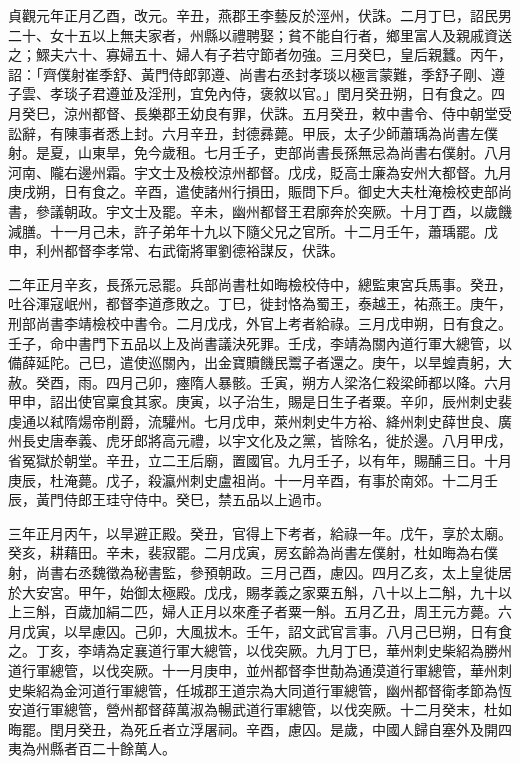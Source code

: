 \begin{pinyinscope}
 貞觀元年正月乙酉，改元。辛丑，燕郡王李藝反於涇州，伏誅。二月丁巳，詔民男二十、女十五以上無夫家者，州縣以禮聘娶；貧不能自行者，鄉里富人及親戚資送之；鰥夫六十、寡婦五十、婦人有子若守節者勿強。三月癸巳，皇后親蠶。丙午，詔：「齊僕射崔季舒、黃門侍郎郭遵、尚書右丞封孝琰以極言蒙難，季舒子剛、遵子雲、孝琰子君遵並及淫刑，宜免內侍，褒敘以官。」閏月癸丑朔，日有食之。四月癸巳，涼州都督、長樂郡王幼良有罪，伏誅。五月癸丑，敕中書令、侍中朝堂受訟辭，有陳事者悉上封。六月辛丑，封德彞薨。甲辰，太子少師蕭瑀為尚書左僕射。是夏，山東旱，免今歲租。七月壬子，吏部尚書長孫無忌為尚書右僕射。八月河南、隴右邊州霜。宇文士及檢校涼州都督。戊戌，貶高士廉為安州大都督。九月庚戌朔，日有食之。辛酉，遣使諸州行損田，賑問下戶。御史大夫杜淹檢校吏部尚書，參議朝政。宇文士及罷。辛未，幽州都督王君廓奔於突厥。十月丁酉，以歲饑減膳。十一月己未，許子弟年十九以下隨父兄之官所。十二月壬午，蕭瑀罷。戊申，利州都督李孝常、右武衛將軍劉德裕謀反，伏誅。



 二年正月辛亥，長孫元忌罷。兵部尚書杜如晦檢校侍中，總監東宮兵馬事。癸丑，吐谷渾寇岷州，都督李道彥敗之。丁巳，徙封恪為蜀王，泰越王，祐燕王。庚午，刑部尚書李靖檢校中書令。二月戊戌，外官上考者給祿。三月戊申朔，日有食之。壬子，命中書門下五品以上及尚書議決死罪。壬戌，李靖為關內道行軍大總管，以備薛延陀。己巳，遣使巡關內，出金寶贖饑民鬻子者還之。庚午，以旱蝗責躬，大赦。癸酉，雨。四月己卯，瘞隋人暴骸。壬寅，朔方人梁洛仁殺梁師都以降。六月甲申，詔出使官稟食其家。庚寅，以子治生，賜是日生子者粟。辛卯，辰州刺史裴虔通以弒隋煬帝削爵，流驩州。七月戊申，萊州刺史牛方裕、絳州刺史薛世良、廣州長史唐奉義、虎牙郎將高元禮，以宇文化及之黨，皆除名，徙於邊。八月甲戌，省冤獄於朝堂。辛丑，立二王后廟，置國官。九月壬子，以有年，賜酺三日。十月庚辰，杜淹薨。戊子，殺瀛州刺史盧祖尚。十一月辛酉，有事於南郊。十二月壬辰，黃門侍郎王珪守侍中。癸巳，禁五品以上過市。



 三年正月丙午，以旱避正殿。癸丑，官得上下考者，給祿一年。戊午，享於太廟。癸亥，耕藉田。辛未，裴寂罷。二月戊寅，房玄齡為尚書左僕射，杜如晦為右僕射，尚書右丞魏徵為秘書監，參預朝政。三月己酉，慮囚。四月乙亥，太上皇徙居於大安宮。甲午，始御太極殿。戊戌，賜孝義之家粟五斛，八十以上二斛，九十以上三斛，百歲加絹二匹，婦人正月以來產子者粟一斛。五月乙丑，周王元方薨。六月戊寅，以旱慮囚。己卯，大風拔木。壬午，詔文武官言事。八月己巳朔，日有食之。丁亥，李靖為定襄道行軍大總管，以伐突厥。九月丁巳，華州刺史柴紹為勝州道行軍總管，以伐突厥。十一月庚申，並州都督李世勣為通漠道行軍總管，華州刺史柴紹為金河道行軍總管，任城郡王道宗為大同道行軍總管，幽州都督衛孝節為恆安道行軍總管，營州都督薛萬淑為暢武道行軍總管，以伐突厥。十二月癸末，杜如晦罷。閏月癸丑，為死丘者立浮屠祠。辛酉，慮囚。是歲，中國人歸自塞外及開四夷為州縣者百二十餘萬人。




\end{pinyinscope}
